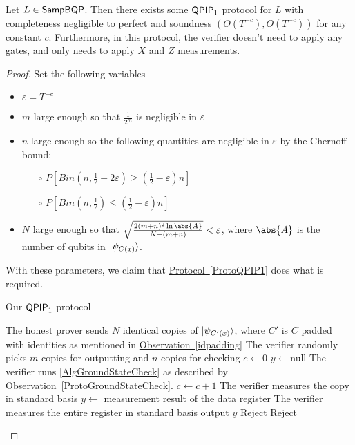 \begin{theorem}
	Let $L\in\operatorname{\mathsf{SampBQP}}$. Then there exists some $\operatorname{\mathsf{QPIP}}_1$ protocol for $L$ with completeness negligible to perfect and soundness $(O(T^{-c}), O(T^{-c}))$ for any constant $c$. Furthermore, in this protocol, the verifier doesn't need to apply any gates, and only needs to apply $X$ and $Z$ measurements.
\end{theorem}
\begin{proof}
	Set the following variables
	\begin{itemize}
		\item $\varepsilon=T^{-c}$
		\item $m$ large enough so that $\frac{1}{2^m}$ is negligible in $\varepsilon$
		\item $n$ large enough so the following quantities are negligible in $\varepsilon$ by the Chernoff bound:
			\begin{itemize}
				\item[$\circ$] $P\left[Bin(n, \frac{1}{2}-2\varepsilon)\geq\left(\frac{1}{2}-\varepsilon\right)n\right]$
				\item[$\circ$] $P\left[Bin(n, \frac{1}{2})\leq\left(\frac{1}{2}-\varepsilon\right)n\right]$
			\end{itemize}
		\item $N$ large enough so that $\sqrt{\frac{2(m+n)^2\ln\abs{A}}{N-(m+n)}}<\varepsilon$, where $\abs{A}$ is the number of qubits in $\ket{\psi_{C(x)}}$.
	\end{itemize}

	With these parameters, we claim that \hyperref[ProtoQPIP1]{Protocol~\ref*{ProtoQPIP1}} does what is required.
	\begin{algorithm}
		\caption{Our $\operatorname{\mathsf{QPIP}}_1$ protocol}
		\label{ProtoQPIP1}
		\begin{algorithmic}[1]
			\State The honest prover sends $N$ identical copies of $\ket{\psi_{C'(x)}}$, where $C'$ is $C$ padded with identities as mentioned in \hyperref[idpadding]{Observation~\ref*{idpadding}}
			\State The verifier randomly picks $m$ copies for outputting and $n$ copies for checking
			\State $c\gets0$
			\State $y\gets$null
				\State The verifier runs \autoref{AlgGroundStateCheck} as described by \hyperref[ProtoGroundStateCheck]{Observation~\ref*{ProtoGroundStateCheck}}.
			        $c\gets c+1$
			    \EndIf
			    \State The verifier measures the copy in standard basis
			            $y\gets$ measurement result of the data register
                    \EndIf
			    \EndIf
			    \Else
			    \State The verifier measures the entire register in standard basis
			    \EndIf
			\EndFor
			\State output $y$
			\Else
			\State Reject
			\EndIf
			\Else
			\State Reject
			\EndIf
		\end{algorithmic}
	\end{algorithm}
	

\end{proof}
